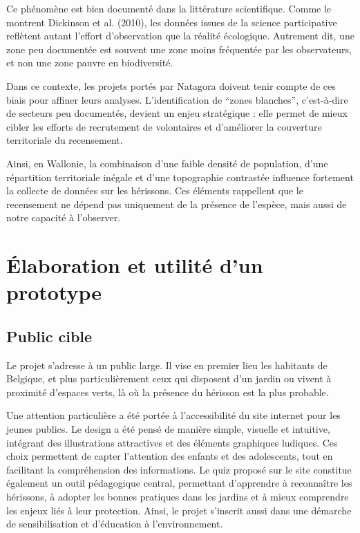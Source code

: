 \documentclass[a4paper,11pt]{article}
\begin{document}
Ce phénomène est bien documenté dans la littérature scientifique. Comme le montrent Dickinson et al. (2010), les données issues de la science participative reflètent autant l’effort d’observation que la réalité écologique. Autrement dit, une zone peu documentée est souvent une zone moins fréquentée par les observateurs, et non une zone pauvre en biodiversité.

Dans ce contexte, les projets portés par Natagora doivent tenir compte de ces biais pour affiner leurs analyses. L’identification de \enquote{zones blanches}, c’est-à-dire de secteurs peu documentés, devient un enjeu stratégique : elle permet de mieux cibler les efforts de recrutement de volontaires et d’améliorer la couverture territoriale du recensement.

Ainsi, en Wallonie, la combinaison d’une faible densité de population, d’une répartition territoriale inégale et d’une topographie contrastée influence fortement la collecte de données sur les hérissons. Ces éléments rappellent que le recensement ne dépend pas uniquement de la présence de l’espèce, mais aussi de notre capacité à l’observer.

\section{Élaboration et utilité d’un prototype}

\subsection{Public cible}

Le projet s’adresse à un public large. Il vise en premier lieu les habitants de Belgique, et plus particulièrement ceux qui disposent d’un jardin ou vivent à proximité d’espaces verts, là où la présence du hérisson est la plus probable.

Une attention particulière a été portée à l’accessibilité du site internet pour les jeunes publics. Le design a été pensé de manière simple, visuelle et intuitive, intégrant des illustrations attractives et des éléments graphiques ludiques. Ces choix permettent de capter l’attention des enfants et des adolescents, tout en facilitant la compréhension des informations. Le quiz proposé sur le site constitue également un outil pédagogique central, permettant d’apprendre à reconnaître les hérissons, à adopter les bonnes pratiques dans les jardins et à mieux comprendre les enjeux liés à leur protection. Ainsi, le projet s’inscrit aussi dans une démarche de sensibilisation et d’éducation à l’environnement.
\end{document}
